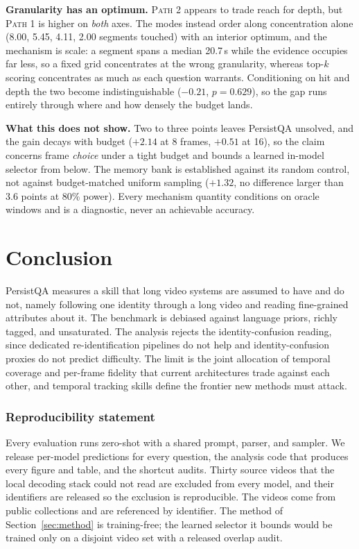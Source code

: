 \documentclass{article}
\newcommand{\bench}{PersistQA}
\begin{document}
\textbf{Granularity has an optimum.} \textsc{Path 2} appears to trade reach for depth, but
\textsc{Path 1} is higher on \emph{both} axes. The modes instead order along concentration alone
(8.00, 5.45, 4.11, 2.00 segments touched) with an interior optimum, and the mechanism is scale: a
segment spans a median 20.7\,s while the evidence occupies far less, so a fixed grid concentrates at
the wrong granularity, whereas top-$k$ scoring concentrates as much as each question warrants.
Conditioning on hit and depth the two become indistinguishable ($-0.21$, $p{=}0.629$), so the gap
runs entirely through where and how densely the budget lands.

\textbf{What this does not show.} Two to three points leaves \bench{} unsolved, and the gain decays
with budget ($+2.14$ at 8 frames, $+0.51$ at 16), so the claim concerns frame \emph{choice} under a
tight budget and bounds a learned in-model selector from below. The memory bank is established
against its random control, not against budget-matched uniform sampling ($+1.32$, no difference
larger than 3.6 points at 80\% power). Every mechanism quantity conditions on oracle windows and is a
diagnostic, never an achievable accuracy.

\section{Conclusion}
\bench{} measures a skill that long video systems are assumed to have and do not, namely following one identity through a long video and reading fine-grained attributes about it. The benchmark is debiased against language priors, richly tagged, and unsaturated. The analysis rejects the identity-confusion reading, since dedicated re-identification pipelines do not help and identity-confusion proxies do not predict difficulty. The limit is the joint allocation of temporal coverage and per-frame fidelity that current architectures trade against each other, and temporal tracking skills define the frontier new methods must attack.

\subsubsection*{Reproducibility statement}
Every evaluation runs zero-shot with a shared prompt, parser, and sampler. We release per-model predictions for every question, the analysis code that produces every figure and table, and the shortcut audits. Thirty source videos that the local decoding stack could not read are excluded from every model, and their identifiers are released so the exclusion is reproducible. The videos come from public collections and are referenced by identifier. The method of Section~\ref{sec:method} is training-free; the learned selector it bounds would be trained only on a disjoint video set with a released overlap audit.
\end{document}
